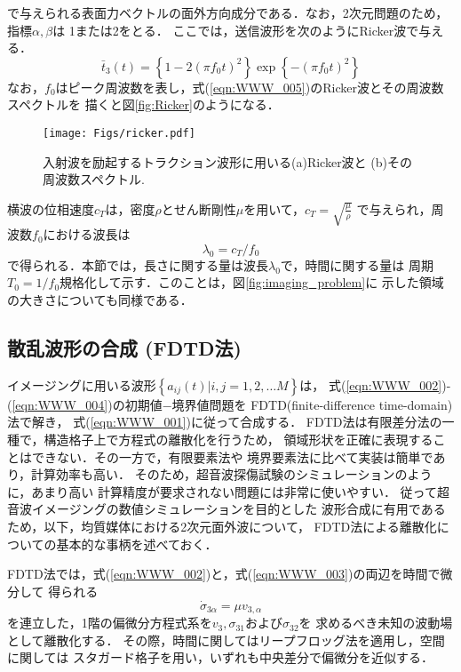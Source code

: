 で与えられる表面力ベクトルの面外方向成分である．なお，2次元問題のため，指標$\alpha,\beta$は
1または2をとる．
ここでは，送信波形を次のようにRicker波で与える．
\begin{equation}
	\bar{t}_3(t)=\left\{ 1-2\left(\pi f_0t\right)^2 \right\}\exp\left\{-(\pi f_0 t)^2\right\}
	\label{eqn:WWW_005}
\end{equation}
なお，$f_0$はピーク周波数を表し，式(\ref{eqn:WWW_005})のRicker波とその周波数スペクトルを
描くと図\ref{fig:Ricker}のようになる．
\begin{figure}[h]
	\begin{center}
	\texttt{[image: Figs/ricker.pdf]} 
	\end{center}
	\caption{入射波を励起するトラクション波形に用いる(a)Ricker波と
	(b)その周波数スペクトル.} 
	\label{fig:ricker}
\end{figure}
横波の位相速度$c_T$は，密度$\rho$とせん断剛性$\mu$を用いて，$c_T=\sqrt{\frac{\mu}{\rho}}$
で与えられ，周波数$f_0$における波長は
\begin{equation}
	\lambda_0 = c_T/f_0
	\label{eqn:WWW_006}
\end{equation}
で得られる．本節では，長さに関する量は波長$\lambda_0$で，時間に関する量は
周期$T_0=1/f_0$規格化して示す．このことは，図\ref{fig:imaging_problem}に
示した領域の大きさについても同様である．
\subsection{散乱波形の合成 (FDTD法)}
イメージングに用いる波形$\left\{ a_{ij}(t)\left|i,j=1,2,\dots M\right.\right\}$は，
式(\ref{eqn:WWW_002})-(\ref{eqn:WWW_004})の初期値−境界値問題を
FDTD(finite-difference time-domain)法で解き，
式(\ref{eqn:WWW_001})に従って合成する．
FDTD法は有限差分法の一種で，構造格子上で方程式の離散化を行うため，
領域形状を正確に表現することはできない．その一方で，有限要素法や
境界要素法に比べて実装は簡単であり，計算効率も高い．
そのため，超音波探傷試験のシミュレーションのように，あまり高い
計算精度が要求されない問題には非常に使いやすい．
従って超音波イメージングの数値シミュレーションを目的とした
波形合成に有用であるため，以下，均質媒体における2次元面外波について，
FDTD法による離散化についての基本的な事柄を述べておく．

FDTD法では，式(\ref{eqn:WWW_002})と，式(\ref{eqn:WWW_003})の両辺を時間で微分して
得られる
\begin{equation}
	\dot \sigma_{3\alpha}=\mu v_{3,\alpha}
	\label{eqn:WWW_007}
\end{equation}
を連立した，1階の偏微分方程式系を$v_3,\sigma_{31}$および$\sigma_{32}$を
求めるべき未知の波動場として離散化する．
その際，時間に関してはリープフロッグ法を適用し，空間に関しては
スタガード格子を用い，いずれも中央差分で偏微分を近似する．


